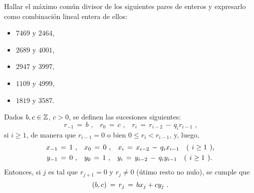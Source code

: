 % 
% 
\begin{ejerDivisibilidad}
	Hallar el m\'aximo com\'un divisor de los siguientes pares de
	enteros y expresarlo como combinaci\'on lineal entera de ellos:
	\begin{itemize}
		\item $7469$ y $2464$,
		\item $2689$ y $4001$,
		\item $2947$ y $3997$,
		\item $1109$ y $4999$,
		\item $1819$ y $3587$.
	\end{itemize}
\end{ejerDivisibilidad}

\begin{ejerDivisibilidad}\label{ejer:divisibilidad:euclides}
	Dados $b,c\in\mathbb{Z}$, $c>0$, se definen las sucesiones siguientes:
	\begin{displaymath}
		r_{-1}\,=\,b\text{ ,}\quad r_0\,=\,c\text{ ,}\quad
			r_i\,=\,r_{i-2}\,-\,q_ir_{i-1}\text{ ,}
	\end{displaymath}
	si $i\geq 1$, de manera que $r_{i-1}=0$ o bien $0\leq r_i<r_{i-1}$,
	y, luego,
	\begin{displaymath}
		\begin{aligned}
			x_{-1} & \,=\,1\text{ ,}\quad
				x_0\,=\,0\text{ ,}\quad
				x_i\,=\,x_{i-2}\,-\,q_ix_{i-1}
				\quad\text{(\phantom)}i\geq 1
					\text{\phantom(),} \\
			y_{-1} & \,=\,0\text{ ,}\quad
				y_0\,=\,1\text{ ,}\quad
				y_i\,=\,y_{i-2}\,-\,q_iy_{i-1}
				\quad\text{(\phantom)}i\geq 1
					\text{\phantom().}
		\end{aligned}
	\end{displaymath}
	Entonces, si $j$ es tal que $r_{j+1}=0$ y $r_j\neq 0$ (\'utimo
	resto no nulo), se cumple que
	\begin{displaymath}
		\left({b,c}\right)_{}\,=\,r_j\,=\,bx_j+cy_j
		\text{ .}
	\end{displaymath}
\end{ejerDivisibilidad}

